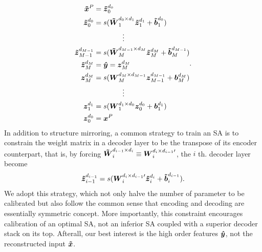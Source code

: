 {\begin{equation} \label{eq:ED}
\begin{split}
  \xDC^P &= \zDI{0}{0} \\
  \zDI{0  }{0  } &= s(\WDI{1  }{0  }{1  } \zDI{1  }{1  } + \bDI{1}{0  }) \\
  & \quad \quad \quad \quad \vdots \\
  \zDI{M-1}{M-1} &= s(\WDI{M  }{M-1}{M  } \zDI{M  }{M  } + \bDI{M}{M-1}) \\
  \zDI{M  }{M  } &= \yHT = \zEI{M}{M} \\
  \zEI{M  }{M  } &= s(\WEI{M  }{M  }{M-1} \zEI{M-1}{M-1} + \bEI{M}{M  }) \\
  & \quad \quad \quad \quad \vdots \\
  \zEI{1  }{1  } &= s(\WEI{1  }{1  }{0  } \zEI{0  }{0  } + \bEI{1}{1  }) \\
  \zEI{0  }{0  } &= \xEC^P
\end{split}.
\end{equation}
In addition to structure mirroring, a common strategy to train an SA is to constrain the weight matrix in a decoder layer to be the transpose of its encoder counterpart, that is, by forcing $\WDI{i}{i-1}{i} \equiv \WEIt{i}{i}{i-1}$, the $i$ th. decoder layer become
\begin{equation} \label{eq:CW}
  \zDI{i-1}{i-1} = s(\WEIt{i}{i}{i-1} \zDI{i  }{i  } + \bDI{i  }{i-1}).
\end{equation}
We adopt this strategy, which not only halve the number of parameter to be calibrated but also follow the common sense that encoding and decoding are essentially symmetric concept. More importantly, this constraint encourages calibration of an optimal SA, not an inferior SA coupled with a superior decoder stack on its top. Afterall, our best interest is the high order features $\yHT$, not the reconstructed input $\xDC$.

}
